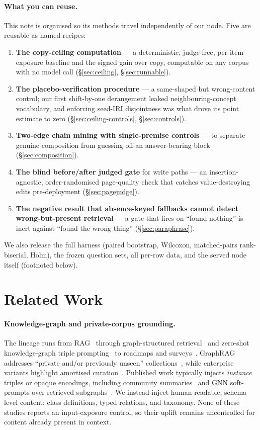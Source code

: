 \documentclass[10pt,twocolumn]{article}
\begin{document}
\paragraph{What you can reuse.} This note is organised so its methods travel independently of our node. Five are reusable as named recipes:
\begin{enumerate}[topsep=2pt,itemsep=1pt,leftmargin=1.5em]
\item \textbf{The copy-ceiling computation} --- a deterministic, judge-free, per-item exposure baseline and the signed gain over copy, computable on any corpus with no model call (\S\ref{sec:ceiling}, \S\ref{sec:runnable}).
\item \textbf{The placebo-verification procedure} --- a same-shaped but wrong-content control; our first shift-by-one derangement leaked neighbouring-concept vocabulary, and enforcing seed-IRI disjointness was what drove its point estimate to zero (\S\ref{sec:ceiling-controls}, \S\ref{sec:controls}).
\item \textbf{Two-edge chain mining with single-premise controls} --- to separate genuine composition from guessing off an answer-bearing block (\S\ref{sec:composition}).
\item \textbf{The blind before/after judged gate} for write paths --- an insertion-agnostic, order-randomised page-quality check that catches value-destroying edits pre-deployment (\S\ref{sec:pagejudge}).
\item \textbf{The negative result that absence-keyed fallbacks cannot detect wrong-but-present retrieval} --- a gate that fires on ``found nothing'' is inert against ``found the wrong thing'' (\S\ref{sec:paraphrase}).
\end{enumerate}
We also release the full harness (paired bootstrap, Wilcoxon, matched-pairs rank-biserial, Holm), the frozen question sets, all per-row data, and the served node itself (footnoted below).


\section{Related Work}\label{sec:related}
\paragraph{Knowledge-graph and private-corpus grounding.}
The lineage runs from RAG~\cite{lewis2020rag} through graph-structured retrieval~\cite{edge2024graphrag,guo2024lightrag} and zero-shot knowledge-graph triple prompting~\cite{baek2023kaping} to roadmaps and surveys~\cite{pan2024unifying,peng2024graphragsurvey}. GraphRAG addresses ``private and/or previously unseen'' collections~\cite{edge2024graphrag}, while enterprise variants highlight amortised curation~\cite{jiang2025practicalgraphrag}. Published work typically injects \emph{instance} triples or opaque encodings, including community summaries~\cite{edge2024graphrag} and GNN soft-prompts over retrieved subgraphs~\cite{he2024gretriever}. We instead inject human-readable, schema-level content: class definitions, typed relations, and taxonomy. None of these studies reports an input-exposure control, so their uplift remains uncontrolled for content already present in context.
\end{document}
